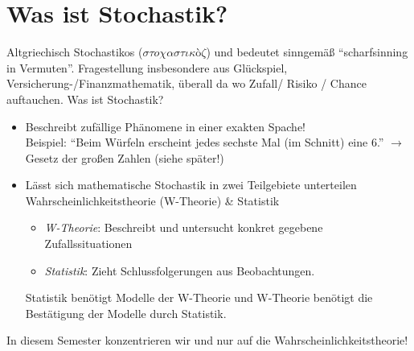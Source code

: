 \chapter*{Was ist Stochastik?}

Altgriechisch Stochastikos ($\sigma \tau o \chi \alpha \sigma \tau \iota \kappa$\`{o}$ \zeta$) und bedeutet sinngemäß ``scharfsinning in Vermuten''.
\nl
Fragestellung insbesondere aus Glückspiel, Versicherung-/Finanzmathematik, überall da wo Zufall/ Risiko / Chance auftauchen.
\nl
Was ist Stochastik?
\begin{itemize}
	\item Beschreibt zufällige Phänomene in einer exakten Spache!\\
	Beispiel: ``Beim Würfeln erscheint jedes sechste Mal (im Schnitt) eine 6.'' $\longrightarrow$ Gesetz der großen Zahlen (siehe später!) %
	\item Lässt sich mathematische Stochastik in zwei Teilgebiete unterteilen\\
	Wahrscheinlichkeitstheorie (W-Theorie) \& Statistik
	\begin{itemize}
		\item \textit{W-Theorie}: Beschreibt und untersucht konkret gegebene Zufallssituationen
		\item \textit{Statistik}: Zieht Schlussfolgerungen aus Beobachtungen.
	\end{itemize}
	Statistik benötigt Modelle der W-Theorie und W-Theorie benötigt die Bestätigung der Modelle durch Statistik.
\end{itemize}
In diesem Semester konzentrieren wir und nur auf die Wahrscheinlichkeitstheorie!